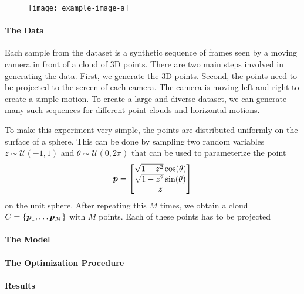 		\begin{figure}[tb]
			\centering
			\texttt{[image: example-image-a]}
			\caption[]
					{}
			\label{}
		\end{figure}
	
		\paragraph{The Data}
		Each sample from the dataset is a synthetic sequence of frames seen by a moving camera in front of a cloud of 3D points.
		There are two main steps involved in generating the data.
		First, we generate the 3D points.
		Second, the points need to be projected to the screen of each camera.
		The camera is moving left and right to create a simple motion.
		To create a large and diverse dataset, we can generate many such sequences for different point clouds and horizontal motions.
		
		To make this experiment very simple, the points are distributed uniformly on the surface of a sphere.
		This can be done by sampling two random variables $z \sim \mathcal{U}(-1, 1)$ and $\theta \sim \mathcal{U}(0, 2\pi)$ that can be used to parameterize the point
		\begin{equation}
			\bm{p} = 
			\begin{bmatrix}
				\sqrt{1 - z^2} \cos(\theta) \\ 
				\sqrt{1 - z^2} \sin(\theta) \\
				z
			\end{bmatrix}
		\end{equation}
		on the unit sphere. 
		After repeating this $M$ times, we obtain a cloud $C = \{\vectr{p}_1, \dots \vectr{p}_M\}$ with $M$ points.
		Each of these points has to be projected
		
		
		\paragraph{The Model}
		
		\paragraph{The Optimization Procedure}
		
		\paragraph{Results}
		
		\paragraph{}
		
		